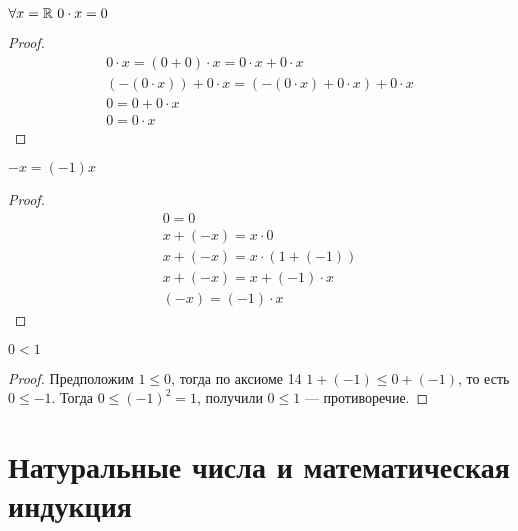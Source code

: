     \begin{theorem}
        $ \forall x = \mathbb{R} \ 0 \cdot  x = 0 $ 
    \end{theorem} \begin{proof}
        \begin{gather}
            0 \cdot x = (0 + 0) \cdot x = 0 \cdot x + 0 \cdot x \\
            ( -(0 \cdot x)) + 0 \cdot x = ( -(0 \cdot x) + 0 \cdot x) + 0 \cdot x \\
            0 = 0 + 0 \cdot x \\
            0 = 0 \cdot x
        \end{gather}
    \end{proof} 
    \begin{exercise}
        $ - x = ( - 1)x $
    \end{exercise} \begin{proof}
        \begin{gather}
            0 = 0 \\
        x + (-x) = x \cdot 0 \\
        x + (-x) = x \cdot (1 + (-1)) \\
        x + (-x) = x + (-1) \cdot x \\
        (-x) = (-1) \cdot x
        \end{gather}
    \end{proof}
    \begin{exercise}
        $ 0 < 1 $
    \end{exercise} \begin{proof}
        Предположим $ 1 \leq 0 $, тогда по аксиоме 14 $ 1 + (-1) \leq 0 + (-1) $, то есть $ 0 \leq - 1 $.
        Тогда $ 0 \leq ( - 1)^2 = 1 $, получили $ 0 \leq  1 $ --- противоречие.
    \end{proof}
\section{Натуральные числа и математическая индукция}
